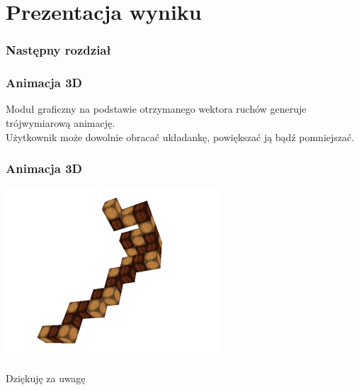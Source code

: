 \documentclass{beamer}
\begin{document}
    \section{Prezentacja wyniku}
    \begin{frame}
		\frametitle{Następny rozdział}
        \tableofcontents[currentsection]
    \end{frame}
    \begin{frame}
    	\frametitle{Animacja 3D}
        Moduł graficzny na podstawie otrzymanego wektora ruchów generuje trójwymiarową animację.\\
        Użytkownik może dowolnie obracać układankę, powiększać ją bądź pomniejszać.
    \end{frame}
    \begin{frame}
    	\frametitle{Animacja 3D}
    	\centering
    	\includegraphics[width=0.6\textwidth]{using.png}
    \end{frame}
    \begin{frame}
        Dziękuję za uwagę
    \end{frame}
\end{document}
